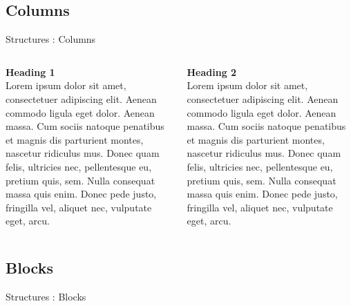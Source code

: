 \documentclass{beamer}
\begin{document}
\subsection{Columns}
\begin{frame}[label=Columns]{Structures : Columns}
\transblindshorizontal
    \begin{columns}
        \begin{column}{.45\textwidth}
             {\textbf{Heading 1} \\ Lorem ipsum dolor sit amet, consectetuer adipiscing elit. Aenean commodo ligula eget dolor. Aenean massa. Cum sociis natoque penatibus et magnis dis parturient montes, nascetur ridiculus mus. Donec quam felis, ultricies nec, pellentesque eu, pretium quis, sem. Nulla consequat massa quis enim. Donec pede justo, fringilla vel, aliquet nec, vulputate eget, arcu. }
        \end{column}
        
        \begin{column}{.45\textwidth}
             \textbf{Heading 2} \\Lorem ipsum dolor sit amet, consectetuer adipiscing elit. Aenean commodo ligula eget dolor. Aenean massa. Cum sociis natoque penatibus et magnis dis parturient montes, nascetur ridiculus mus. Donec quam felis, ultricies nec, pellentesque eu, pretium quis, sem. Nulla consequat massa quis enim. Donec pede justo, fringilla vel, aliquet nec, vulputate eget, arcu.
        \end{column}
    \end{columns}
\end{frame}



\subsection{Blocks} %
\begin{frame}[label=Blocks]{Structures : Blocks}
\transblindsvertical

    
    
\end{frame}
\end{document}
